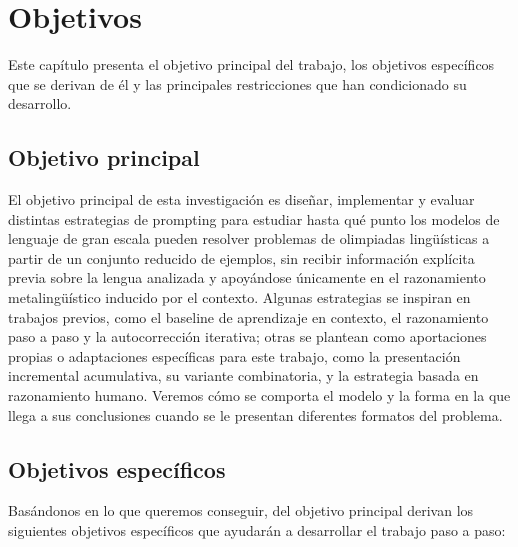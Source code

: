 \chapter{Objetivos}
\label{cap:objetivos}

Este capítulo presenta el objetivo principal del trabajo, los objetivos específicos que se derivan de él y las principales restricciones que han condicionado su desarrollo.

\section{Objetivo principal}
\label{sec:objetivo_principal}

El objetivo principal de esta investigación es diseñar, implementar y evaluar distintas estrategias de prompting para estudiar hasta qué punto los modelos de lenguaje de gran escala pueden resolver problemas de olimpiadas lingüísticas a partir de un conjunto reducido de ejemplos, sin recibir información explícita previa sobre la lengua analizada y apoyándose únicamente en el razonamiento metalingüístico inducido por el contexto. Algunas estrategias se inspiran en trabajos previos, como el baseline de aprendizaje en contexto, el razonamiento paso a paso y la autocorrección iterativa; otras se plantean como aportaciones propias o adaptaciones específicas para este trabajo, como la presentación incremental acumulativa, su variante combinatoria, y la estrategia basada en razonamiento humano. Veremos cómo se comporta el modelo y la forma en la que llega a sus conclusiones cuando se le presentan diferentes formatos del problema.

\section{Objetivos específicos}
\label{sec:objetivos_especificos}

Basándonos en lo que queremos conseguir, del objetivo principal derivan los siguientes objetivos específicos que ayudarán a desarrollar el trabajo paso a paso:

